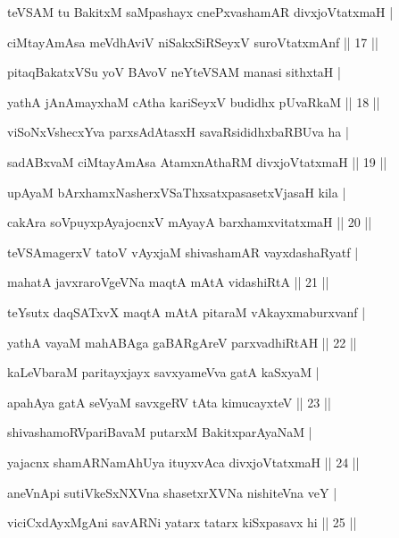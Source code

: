 \documentclass{article}
\begin{document}
  
\begin{sl}
 teVSAM  tu  BakitxM  saMpashayx  cnePxvashamAR  divxjoVtatxmaH |
 
 ciMtayAmAsa  meVdhAviV  niSakxSiRSeyxV  suroVtatxmAnf      ||   17    ||
\end{sl}  
  
  
\begin{sl}
pitaqBakatxVSu  yoV  BAvoV  neYteVSAM  manasi  sithxtaH |

yathA  jAnAmayxhaM  cAtha  kariSeyxV  budidhx pUvaRkaM       ||   18   ||
\end{sl}  
  
  
\begin{sl}
 viSoNxVshecxYva  parxsAdAtasxH  savaRsididhxbaRBUva  ha | 
 
 sadABxvaM  ciMtayAmAsa  AtamxnAthaRM  divxjoVtatxmaH        ||   19   ||
\end{sl}  
  
  
\begin{sl}
 upAyaM  bArxhamxNasherxVSaThxsatxpasasetxVjasaH  kila |
 
 cakAra  soVpuyxpAyajocnxV  mAyayA  barxhamxvitatxmaH      ||    20   ||
\end{sl}  
  
  
\begin{sl}
 teVSAmagerxV  tatoV  vAyxjaM  shivashamAR  vayxdashaRyatf |
 
 mahatA  javxraroVgeVNa  maqtA  mAtA  vidashiRtA           ||   21    ||
\end{sl}  
  
  
\begin{sl}
 teYsutx  daqSATxvX maqtA  mAtA  pitaraM  vAkayxmaburxvanf |
 
 yathA  vayaM  mahABAga  gaBARgAreV  parxvadhiRtAH          ||   22   ||
\end{sl}  
  
  
\begin{sl}
kaLeVbaraM  paritayxjayx  savxyameVva  gatA  kaSxyaM | 
 
 apahAya  gatA  seVyaM  savxgeRV  tAta  kimucayxteV         ||   23   ||
\end{sl}
  
  
\begin{sl}
 shivashamoRVpariBavaM  putarxM  BakitxparAyaNaM |
 
 yajacnx  shamARNamAhUya  ituyxvAca  divxjoVtatxmaH         ||   24    ||
\end{sl}
  
  
\begin{sl}
 aneVnApi  sutiVkeSxNXVna  shasetxrXVNa  nishiteVna  veY |
 
 viciCxdAyxMgAni  savARNi  yatarx  tatarx  kiSxpasavx  hi   ||   25   || 
\end{sl}
  
\end{document}
